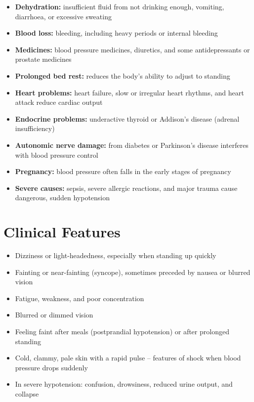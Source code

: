 \begin{itemize}
    \item \textbf{Dehydration:} insufficient fluid from not drinking enough, vomiting, diarrhoea, or excessive sweating
    \item \textbf{Blood loss:} bleeding, including heavy periods or internal bleeding
    \item \textbf{Medicines:} blood pressure medicines, diuretics, and some antidepressants or prostate medicines
    \item \textbf{Prolonged bed rest:} reduces the body's ability to adjust to standing
    \item \textbf{Heart problems:} heart failure, slow or irregular heart rhythms, and heart attack reduce cardiac output
    \item \textbf{Endocrine problems:} underactive thyroid or Addison's disease (adrenal insufficiency)
    \item \textbf{Autonomic nerve damage:} from diabetes or Parkinson's disease interferes with blood pressure control
    \item \textbf{Pregnancy:} blood pressure often falls in the early stages of pregnancy
    \item \textbf{Severe causes:} sepsis, severe allergic reactions, and major trauma cause dangerous, sudden hypotension
\end{itemize}

\section*{Clinical Features}
\begin{itemize}
    \item Dizziness or light-headedness, especially when standing up quickly
    \item Fainting or near-fainting (syncope), sometimes preceded by nausea or blurred vision
    \item Fatigue, weakness, and poor concentration
    \item Blurred or dimmed vision
    \item Feeling faint after meals (postprandial hypotension) or after prolonged standing
    \item Cold, clammy, pale skin with a rapid pulse -- features of shock when blood pressure drops suddenly
    \item In severe hypotension: confusion, drowsiness, reduced urine output, and collapse
\end{itemize}

